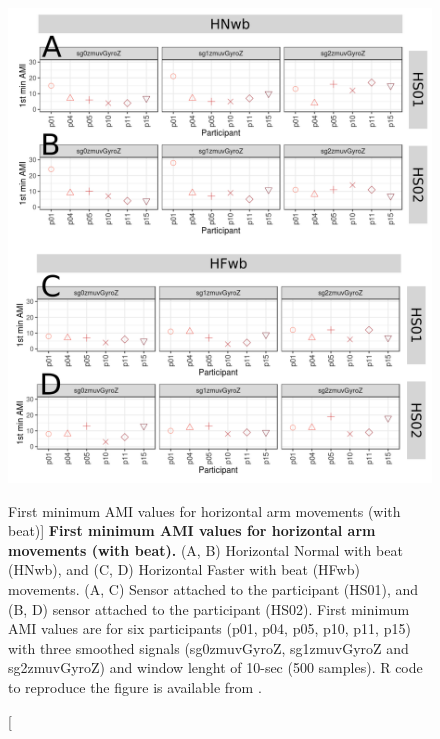 \begin{figure}
\centering
\includegraphics[width=1.0\textwidth]{ami_Hwb_w10}
	\caption
	[First minimum AMI values for horizontal arm movements (with beat)]{
	{\bf First minimum AMI values for horizontal arm movements (with beat).}
		(A, B) Horizontal Normal with beat (HNwb), and 
		(C, D) Horizontal Faster with beat (HFwb) movements.
		(A, C) Sensor attached to the participant (HS01), and
		(B, D) sensor attached to the participant (HS02).
		First minimum AMI values are for six participants 
		(p01, p04, p05, p10, p11, p15) with three smoothed 
		signals (sg0zmuvGyroZ, sg1zmuvGyroZ and sg2zmuvGyroZ) and 
		window lenght of 10-sec (500 samples).
		R code to reproduce the figure is available 
		from \cite{xochicale2018}.
        }
    \label{fig:amiHwb}
\end{figure}

